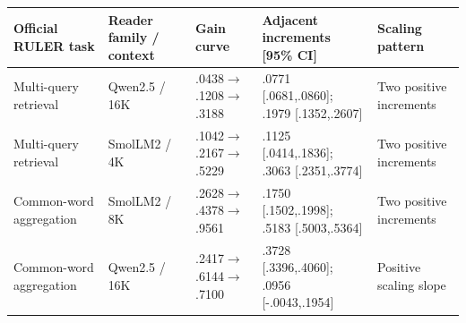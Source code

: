 \begin{tabular}{>{\raggedright\arraybackslash}p{}>{\raggedright\arraybackslash}p{}>{\raggedright\arraybackslash}p{}>{\raggedright\arraybackslash}p{}>{\raggedright\arraybackslash}p{}}
\toprule
Official RULER task & Reader family / context & Gain curve & Adjacent increments [95\% CI] & Scaling pattern \\
\midrule
Multi-query retrieval & Qwen2.5 / 16K & .0438$\to$.1208$\to$.3188 & .0771 [.0681,.0860]; .1979 [.1352,.2607] & Two positive increments \\
Multi-query retrieval & SmolLM2 / 4K & .1042$\to$.2167$\to$.5229 & .1125 [.0414,.1836]; .3063 [.2351,.3774] & Two positive increments \\
Common-word aggregation & SmolLM2 / 8K & .2628$\to$.4378$\to$.9561 & .1750 [.1502,.1998]; .5183 [.5003,.5364] & Two positive increments \\
Common-word aggregation & Qwen2.5 / 16K & .2417$\to$.6144$\to$.7100 & .3728 [.3396,.4060]; .0956 [-.0043,.1954] & Positive scaling slope \\
\bottomrule
\end{tabular}
